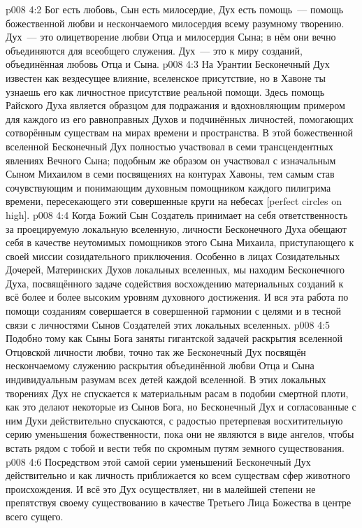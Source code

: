 \vs p008 4:2 Бог есть любовь, Сын есть милосердие, Дух есть помощь~--- помощь божественной любви и нескончаемого милосердия всему разумному творению. Дух~--- это олицетворение любви Отца и милосердия Сына; в нём они вечно объединяются для всеобщего служения. Дух~--- это  к миру созданий, объединённая любовь Отца и Сына.
\vs p008 4:3 На Урантии Бесконечный Дух известен как вездесущее влияние, вселенское присутствие, но в Хавоне ты узнаешь его как личностное присутствие реальной помощи. Здесь помощь Райского Духа является образцом для подражания и вдохновляющим примером для каждого из его равноправных Духов и подчинённых личностей, помогающих сотворённым существам на мирах времени и пространства. В этой божественной вселенной Бесконечный Дух полностью участвовал в семи трансцендентных явлениях Вечного Сына; подобным же образом он участвовал с изначальным Сыном Михаилом в семи посвящениях на контурах Хавоны, тем самым став сочувствующим и понимающим духовным помощником каждого пилигрима времени, пересекающего эти совершенные круги на небесах [perfect circles on high].
\vs p008 4:4 \pc Когда Божий Сын Создатель принимает на себя ответственность за проецируемую локальную вселенную, личности Бесконечного Духа обещают себя в качестве неутомимых помощников этого Сына Михаила, приступающего к своей миссии созидательного приключения. Особенно в лицах Созидательных Дочерей, Материнских Духов локальных вселенных, мы находим Бесконечного Духа, посвящённого задаче содействия восхождению материальных созданий к всё более и более высоким уровням духовного достижения. И вся эта работа по помощи созданиям совершается в совершенной гармонии с целями и в тесной связи с личностями Сынов Создателей этих локальных вселенных.
\vs p008 4:5 Подобно тому как Сыны Бога заняты гигантской задачей раскрытия вселенной Отцовской личности любви, точно так же Бесконечный Дух посвящён нескончаемому служению раскрытия объединённой любви Отца и Сына индивидуальным разумам всех детей каждой вселенной. В этих локальных творениях Дух не спускается к материальным расам в подобии смертной плоти, как это делают некоторые из Сынов Бога, но Бесконечный Дух и согласованные с ним Духи действительно спускаются, с радостью претерпевая восхитительную серию уменьшения божественности, пока они не являются в виде ангелов, чтобы встать рядом с тобой и вести тебя по скромным путям земного существования.
\vs p008 4:6 Посредством этой самой серии уменьшений Бесконечный Дух действительно и как личность приближается ко всем существам сфер животного происхождения. И всё это Дух осуществляет, ни в малейшей степени не препятствуя своему существованию в качестве Третьего Лица Божества в центре всего сущего.
